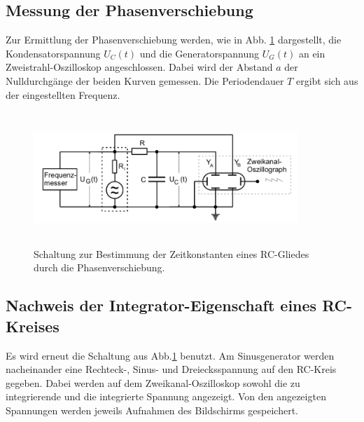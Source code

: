 \subsection{Messung der Phasenverschiebung}
Zur Ermittlung der Phasenverschiebung werden, wie in Abb. \ref{fig:4c} dargestellt, die Kondensatorspannung $U_{C}(t)$ 
und die Generatorspannung $U_{G}(t)$ an ein Zweistrahl-Oszilloskop angeschlossen. Dabei wird der Abstand $a$ der 
Nulldurchgänge der beiden Kurven gemessen. Die Periodendauer $T$ ergibt sich aus der eingestellten Frequenz.%
\begin{figure}
  \centering
  \includegraphics[width= 10cm, height=5cm]{build/4c.png}
  \caption{Schaltung zur Bestimmung der Zeitkonstanten eines RC-Gliedes durch die Phasenverschiebung.}
  \label{fig:4c}
\end{figure}

\subsection{Nachweis der Integrator-Eigenschaft eines RC-Kreises}
Es wird erneut die Schaltung aus Abb.\ref{fig:4c} benutzt. Am Sinusgenerator werden nacheinander eine Rechteck-, 
Sinus- und Dreiecksspannung auf den RC-Kreis gegeben. Dabei werden auf dem Zweikanal-Oszilloskop sowohl die 
zu integrierende und die integrierte Spannung angezeigt. Von den angezeigten Spannungen werden jeweils Aufnahmen
des Bildschirms gespeichert. 
